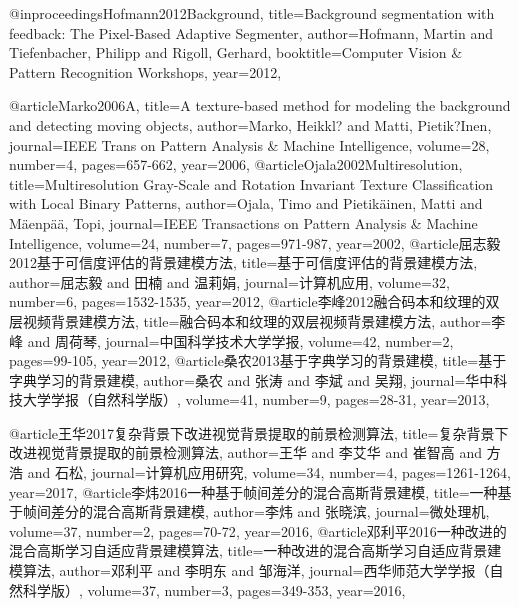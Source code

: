 \documentclass[]{article}
\begin{document}
@inproceedings{Hofmann2012Background,
	title={Background segmentation with feedback: The Pixel-Based Adaptive Segmenter},
	author={Hofmann, Martin and Tiefenbacher, Philipp and Rigoll, Gerhard},
	booktitle={Computer Vision & Pattern Recognition Workshops},
	year={2012},
}

@article{Marko2006A,
	title={A texture-based method for modeling the background and detecting moving objects},
	author={Marko, Heikkl? and Matti, Pietik?Inen},
	journal={IEEE Trans on Pattern Analysis & Machine Intelligence},
	volume={28},
	number={4},
	pages={657-662},
	year={2006},
}
@article{Ojala2002Multiresolution,
	title={Multiresolution Gray-Scale and Rotation Invariant Texture Classification with Local Binary Patterns},
	author={Ojala, Timo and Pietikäinen, Matti and Mäenpää, Topi},
	journal={IEEE Transactions on Pattern Analysis & Machine Intelligence},
	volume={24},
	number={7},
	pages={971-987},
	year={2002},
}
@article{屈志毅2012基于可信度评估的背景建模方法,
	title={基于可信度评估的背景建模方法},
	author={屈志毅 and 田楠 and 温莉娟},
	journal={计算机应用},
	volume={32},
	number={6},
	pages={1532-1535},
	year={2012},
}
@article{李峰2012融合码本和纹理的双层视频背景建模方法,
	title={融合码本和纹理的双层视频背景建模方法},
	author={李峰 and 周荷琴},
	journal={中国科学技术大学学报},
	volume={42},
	number={2},
	pages={99-105},
	year={2012},
}
@article{桑农2013基于字典学习的背景建模,
	title={基于字典学习的背景建模},
	author={桑农 and 张涛 and 李斌 and 吴翔},
	journal={华中科技大学学报（自然科学版）},
	volume={41},
	number={9},
	pages={28-31},
	year={2013},
}

@article{王华2017复杂背景下改进视觉背景提取的前景检测算法,
	title={复杂背景下改进视觉背景提取的前景检测算法},
	author={王华 and 李艾华 and 崔智高 and 方浩 and 石松},
	journal={计算机应用研究},
	volume={34},
	number={4},
	pages={1261-1264},
	year={2017},
}
@article{李炜2016一种基于帧间差分的混合高斯背景建模,
	title={一种基于帧间差分的混合高斯背景建模},
	author={李炜 and 张晓滨},
	journal={微处理机},
	volume={37},
	number={2},
	pages={70-72},
	year={2016},
}
@article{邓利平2016一种改进的混合高斯学习自适应背景建模算法,
	title={一种改进的混合高斯学习自适应背景建模算法},
	author={邓利平 and 李明东 and 邹海洋},
	journal={西华师范大学学报（自然科学版）},
	volume={37},
	number={3},
	pages={349-353},
	year={2016},
}
\end{document}
